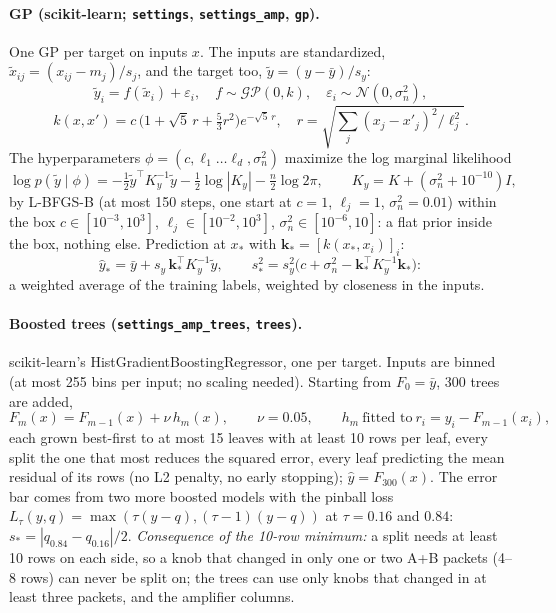 \paragraph{GP (scikit-learn; \texttt{settings}, \texttt{settings\_amp}, \texttt{gp}).} One GP per target on inputs
$x$. The inputs are standardized, $\tilde x_{ij}=(x_{ij}-m_j)/s_j$, and the target too, $\tilde y=(y-\bar y)/s_y$:
\[
\tilde y_i=f(\tilde x_i)+\varepsilon_i,\quad f\sim\mathcal{GP}(0,k),\quad \varepsilon_i\sim\mathcal N(0,\sigma_n^2),
\]
\[
k(x,x')=c\,\big(1+\sqrt5\,r+\tfrac53r^2\big)e^{-\sqrt5\,r},\quad r=\sqrt{\textstyle\sum_j (x_j-x'_j)^2/\ell_j^2}.
\]
The hyperparameters $\phi=(c,\ell_1\ldots\ell_d,\sigma_n^2)$ maximize the log marginal likelihood
\[
\log p(\tilde y\mid\phi)=-\tfrac12\tilde y^\top K_y^{-1}\tilde y-\tfrac12\log|K_y|-\tfrac n2\log2\pi,\qquad K_y=K+(\sigma_n^2+10^{-10})I,
\]
by L-BFGS-B (at most 150 steps, one start at $c=1$, $\ell_j=1$, $\sigma_n^2=0.01$) within the box
$c\in[10^{-3},10^3]$, $\ell_j\in[10^{-2},10^3]$, $\sigma_n^2\in[10^{-6},10]$: a flat prior inside the box, nothing else.
Prediction at $x_*$ with $\mathbf k_*=[k(x_*,x_i)]_i$:
\[
\hat y_*=\bar y+s_y\,\mathbf k_*^\top K_y^{-1}\tilde y,\qquad s_*^2=s_y^2\big(c+\sigma_n^2-\mathbf k_*^\top K_y^{-1}\mathbf k_*\big):
\]
a weighted average of the training labels, weighted by closeness in the inputs.

\paragraph{Boosted trees (\texttt{settings\_amp\_trees}, \texttt{trees}).} scikit-learn's
HistGradientBoostingRegressor, one per target. Inputs are binned (at most 255 bins per input; no scaling needed).
Starting from $F_0=\bar y$, 300 trees are added,
\[
F_m(x)=F_{m-1}(x)+\nu\,h_m(x),\qquad \nu=0.05,\qquad h_m\ \text{fitted to}\ r_i=y_i-F_{m-1}(x_i),
\]
each grown best-first to at most 15 leaves with at least 10 rows per leaf, every split the one that most reduces the
squared error, every leaf predicting the mean residual of its rows (no L2 penalty, no early stopping); $\hat
y=F_{300}(x)$. The error bar comes from two more boosted models with the pinball loss
$L_\tau(y,q)=\max(\tau(y-q),(\tau-1)(y-q))$ at $\tau=0.16$ and $0.84$: $s_*=|q_{0.84}-q_{0.16}|/2$.
\emph{Consequence of the 10-row minimum:} a split needs at least 10 rows on each side, so a knob that changed in only
one or two A+B packets (4--8 rows) can never be split on; the trees can use only knobs that changed in at least three
packets, and the amplifier columns.

